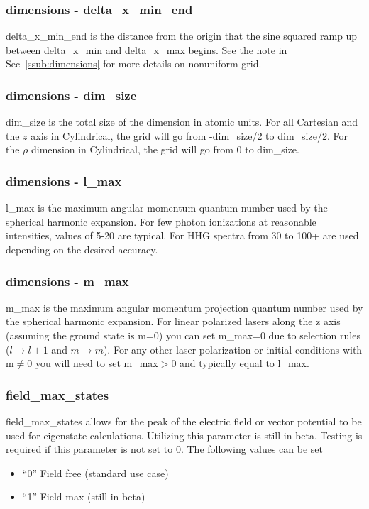 \documentclass{article}
\begin{document}
\subsubsection{dimensions - delta\_x\_min\_end}
delta\_x\_min\_end is the distance from the origin that the sine squared ramp up between delta\_x\_min and delta\_x\_max begins. See the note in Sec~\ref{ssub:dimensions} for more details on nonuniform grid.

\subsubsection{dimensions - dim\_size}
\label{ssub:dimensions-dim_size}
dim\_size is the total size of the dimension in atomic units. For all Cartesian and the $z$ axis in Cylindrical, the grid will go from -dim\_size/2 to dim\_size/2. For the $\rho$ dimension in Cylindrical, the grid will go from 0 to dim\_size.

\subsubsection{dimensions - l\_max}
\label{ssub:dimensions-l_max}
l\_max is the maximum angular momentum quantum number used by the spherical harmonic expansion. For few photon ionizations at reasonable intensities, values of 5-20 are typical. For HHG spectra from 30 to 100+ are used depending on the desired accuracy.

\subsubsection{dimensions - m\_max}
\label{ssub:dimensions-m_max}
m\_max is the maximum angular momentum projection quantum number used by the spherical harmonic expansion. For linear polarized lasers along the z axis (assuming the ground state is m=0) you can set m\_max=0 due to selection rules ($l\rightarrow l\pm1$ and $m\rightarrow m$). For any other laser polarization or initial conditions with m$\ne$0 you will need to set m\_max$>$0 and typically equal to l\_max. 

\subsubsection{field\_max\_states}
\label{ssub:field_max_states}
field\_max\_states allows for the peak of the electric field or vector potential to be used for eigenstate calculations. Utilizing this parameter is still in beta. Testing is required if this parameter is not set to 0. The following values can be set
\begin{itemize}
  \item ``0'' Field free (standard use case)
  \item ``1'' Field max (still in beta)
\end{itemize}
\end{document}
